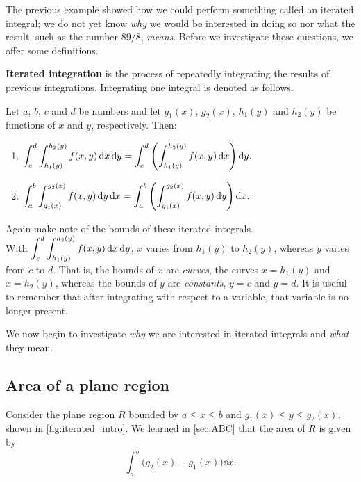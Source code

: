 The previous example showed how we could perform something called an iterated integral; we do not yet know \emph{why} we would be interested in doing so nor what the result, such as the number $89/8$, \emph{means}. Before we investigate these questions, we offer some definitions.

\begin{definition}\label{def:iterated_integral}%
\textbf{Iterated integration} is the process of repeatedly integrating the results of previous integrations. Integrating one integral is denoted as follows.\bigskip

Let $a$, $b$, $c$ and $d$ be numbers and let $g_1(x)$, $g_2(x)$, $h_1(y)$ and $h_2(y)$ be functions of $x$ and $y$, respectively. Then:
\begin{enumerate}
	\item $\displaystyle \int_c^d\int_{h_1(y)}^{h_2(y)} f(x,y)\operatorname{d}\! x\operatorname{d}\! y = \int_c^d\left(\int_{h_1(y)}^{h_2(y)} f(x,y)\operatorname{d}\! x\right)\operatorname{d}\! y.$
	\item $\displaystyle \int_a^b\int_{g_1(x)}^{g_2(x)} f(x,y)\operatorname{d}\! y\operatorname{d}\! x = \int_a^b\left(\int_{g_1(x)}^{g_2(x)} f(x,y)\operatorname{d}\! y\right)\operatorname{d}\! x.$
\end{enumerate}
\end{definition}

Again make note of the bounds of these iterated integrals.\\
With $\displaystyle \int_c^d\int_{h_1(y)}^{h_2(y)} f(x,y)\operatorname{d}\! x\operatorname{d}\! y$, $x$ varies from $h_1(y)$ to $h_2(y)$, whereas $y$ varies from $c$ to $d$. That is, the bounds of $x$ are \emph{curves}, the curves $x=h_1(y)$ and $x=h_2(y)$, whereas the bounds of $y$ are \emph{constants}, $y=c$ and $y=d$. It is useful to remember that
after integrating with respect to a variable, that variable is no longer present.

We now begin to investigate \emph{why} we are interested in iterated integrals and \emph{what} they mean.

\subsection{Area of a plane region}

Consider the plane region $R$ bounded by $a\leq x\leq b$ and $g_1(x)\leq y\leq g_2(x)$, shown in \autoref{fig:iterated_intro}. We learned in \autoref{sec:ABC} that the area of $R$ is given by 
\[\int_a^b \bigl(g_2(x)-g_1(x)\bigr)\dd x.\]

